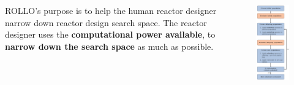 \begin{frame}
\begin{columns}
\begin{column}{0.7\textwidth}
            \vspace{0.2cm}
            ROLLO's purpose is to help the human reactor designer narrow down reactor design 
            search space. The reactor designer uses the \textbf{computational power 
            available}, to \textbf{narrow down the search space} as much as possible.
        \end{column}
        \begin{column}{0.3\textwidth}
            \vspace{-0.3cm}
            \begin{figure}
                \includegraphics[width=0.97\linewidth]{figures/rollo-flow2.png} 

\end{figure}
\end{column}
\end{columns}
\end{frame}
